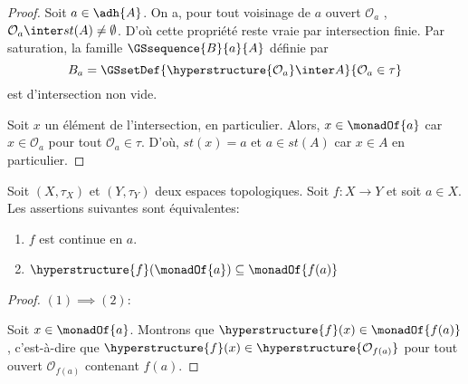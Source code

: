 \ifdefined\outputproof
\begin{proof}
	Soit $a \in \adh{A}$. On a, pour tout voisinage de $a$ ouvert
	$\mathcal{O}_{a}$ , $\mathcal{O}_{a} \inter st(A) \neq \emptyset$.
	D'où cette propriété reste vraie par intersection finie. Par saturation, la
	famille $\GSsequence{B}{a}{A}$ définie par
	\begin{equation}
		B_{a} = \GSsetDef{\hyperstructure{\mathcal{O}_{a}} \inter
	A}{\mathcal{O}_{a} \in \tau}
	\end{equation}
	est d'intersection non vide.

	Soit $x$ un élément de l'intersection, en particulier. Alors, $x \in \monadOf{a}$ car $x \in
	\mathcal{O}_{a}$ pour tout $\mathcal{O}_{a} \in \tau$. D'où, $st(x) = a$ et
	$a \in st(A)$ car $x \in A$ en particulier.
\end{proof}
\fi

\begin{proposition}
	Soit $(X, \tau_{X})$ et $(Y, \tau_{Y})$ deux espaces topologiques. Soit $f :
	X \rightarrow Y$ et soit $a \in X$.
	Les assertions suivantes sont équivalentes:
	\begin{enumerate}
		\item $f$ est continue en $a$.
		\item $\hyperstructure{f}(\monadOf{a}) \subseteq \monadOf{f(a)}$
	\end{enumerate}
\end{proposition}

\ifdefined\outputproof
\begin{proof}
	$(1) \implies (2)$:

	Soit $x \in \monadOf{a}$. Montrons que $\hyperstructure{f}(x) \in
	\monadOf{f(a)}$, c'est-à-dire que $\hyperstructure{f}(x) \in
	\hyperstructure{\mathcal{O}_{f(a)}}$ pour tout ouvert
	$\mathcal{O}_{f(a)}$ contenant $f(a)$.
\end{proof}
\fi
